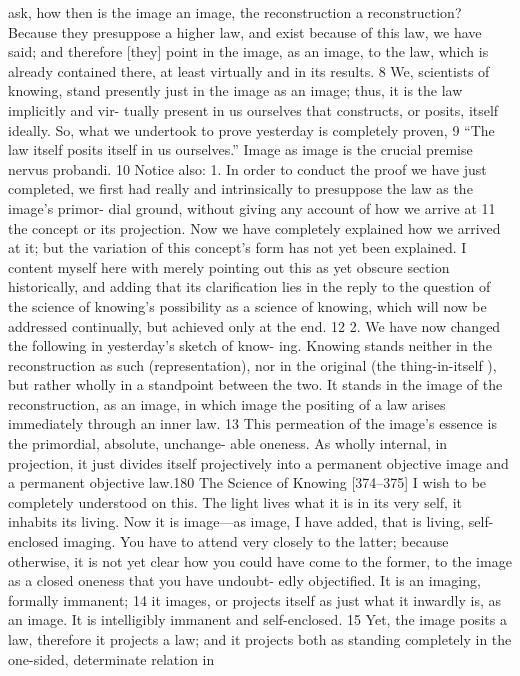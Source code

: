 ask, how then is the image an image, the reconstruction a reconstruction?
Because they presuppose a higher law, and exist because of this law, we have said;
and therefore [they] point in the image, as an image, to the law, which is already
contained there, at least virtually and in its results. 8 We, scientists of knowing,
stand presently just in the image as an image; thus, it is the law implicitly and vir-
tually present in us ourselves that constructs, or posits, itself ideally. So, what we
undertook to prove yesterday is completely proven, 9 “The law itself posits itself
in us ourselves.” Image as image is the crucial premise {nervus probandi}. 10
Notice also: 1. In order to conduct the proof we have just completed, we
first had really and intrinsically to presuppose the law as the image’s primor-
dial ground, without giving any account of how we arrive at 11 the concept or
its projection. Now we have completely explained how we arrived at it; but the
variation of this concept’s form has not yet been explained. I content myself
here with merely pointing out this as yet obscure section historically, and
adding that its clarification lies in the reply to the question of the science of
knowing’s possibility as a science of knowing, which will now be addressed
continually, but achieved only at the end. 12
2. We have now changed the following in yesterday’s sketch of know-
ing. Knowing stands neither in the reconstruction as such (representation),
nor in the original (the thing-in-itself ), but rather wholly in a standpoint
between the two. It stands in the image of the reconstruction, as an image, in
which image the positing of a law arises immediately through an inner law. 13
This permeation of the image’s essence is the primordial, absolute, unchange-
able oneness. As wholly internal, in projection, it just divides itself projectively
into a permanent objective image and a permanent objective law.180
The Science of Knowing
[374–375] I wish to be completely understood on this. The light lives
what it is in its very self, it inhabits its living. Now it is image—as image, I
have added, that is living, self-enclosed imaging. You have to attend very
closely to the latter; because otherwise, it is not yet clear how you could have
come to the former, to the image as a closed oneness that you have undoubt-
edly objectified. It is an imaging, formally immanent; 14 it images, or projects
itself as just what it inwardly is, as an image. It is intelligibly immanent and
self-enclosed. 15 Yet, the image posits a law, therefore it projects a law; and it
projects both as standing completely in the one-sided, determinate relation in

